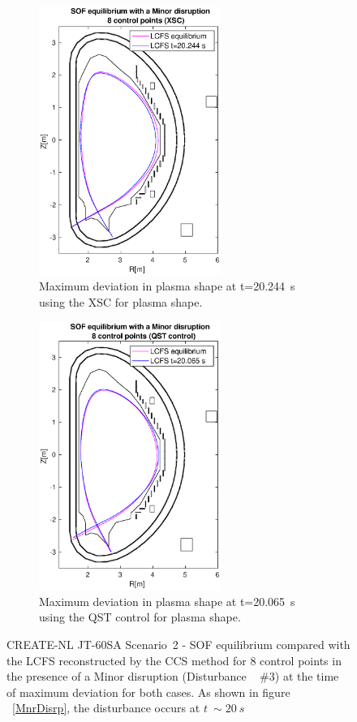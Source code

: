\begin{figure}[h]
	\centering
	\begin{subfigure}[b]{0.32\textwidth}
		\includegraphics[height=8.75cm] {Chp3/Results_iso/8_gaps_mnr_disrp_20.244s.eps}  
		\caption{ Maximum deviation in plasma shape at t=20.244~s using the XSC for plasma shape.
			\label{XSC_20s} }
	\end{subfigure}
	\hspace{2 cm}
	\begin{subfigure}[b]{0.32\textwidth}
		\includegraphics[height=8.75cm] {Chp3/Results_iso/8_gaps_mnr_disrp_20065sFBC.eps}  
		\caption{Maximum deviation in plasma shape at t=20.065~s using the QST control for plasma shape.
			\label{FBC_20s} }
	\end{subfigure}
	
	
	\caption{  CREATE-NL JT-60SA Scenario~2 - SOF equilibrium compared with the LCFS reconstructed by the CCS method for 8 control points in the presence of a Minor disruption (Disturbance ~ $\#3$) at the time of maximum deviation for both cases. As shown in figure ~\ref{MnrDisrp}, the disturbance occurs at $t~\sim 20 ~ s$  \label{20secs}}
\end{figure}



